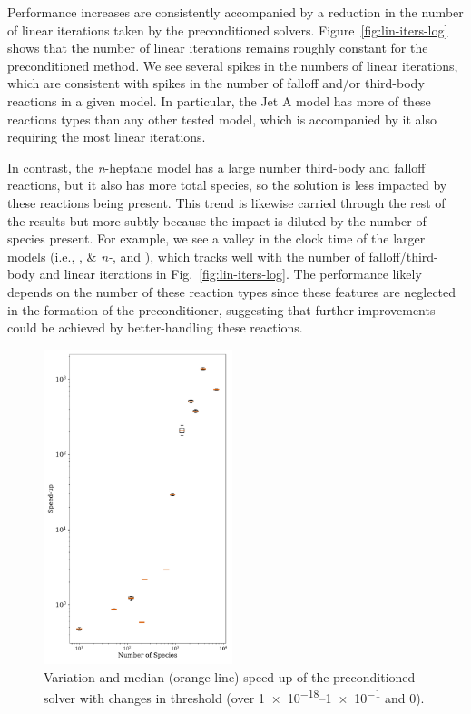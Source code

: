 \documentclass[twocolumn,10pt]{article} %
\begin{document}
Performance increases are consistently accompanied by a reduction in the number of linear iterations taken by the preconditioned solvers.
Figure~\ref{fig:lin-iters-log} shows that the number of linear iterations remains roughly constant for the preconditioned method.
We see several spikes in the numbers of linear iterations, which are consistent with spikes in the number of falloff and/or third-body reactions in a given model.
In particular, the Jet A model has more of these reactions types than any other tested model, which is accompanied by it also requiring the most linear iterations.

In contrast, the \textit{n}-heptane model has a large number third-body and falloff reactions, but it also has more total species, so the solution is less impacted by these reactions being present.
This trend is likewise carried through the rest of the results but more subtly because the impact is diluted by the number of species present.
For example, we see a valley in the clock time of the larger models (i.e., ,  \& \textit{n-}, and ), which tracks well with the number of falloff/third-body and linear iterations in Fig.~\ref{fig:lin-iters-log}.
The performance likely depends on the number of these reaction types since these features are neglected in the formation of the preconditioner, suggesting that further improvements could be achieved by better-handling these reactions.

\begin{figure}[htb]
\centering
\includegraphics[width=0.49\textwidth]{symposium-22/Threshold-BoxWhisker.pdf}
\caption{Variation and median (orange line) speed-up of the preconditioned solver with changes in threshold (over \numrange{1e-18}{1e-1} and 0).}
\label{fig:box_whisker}
\end{figure}
\end{document}
